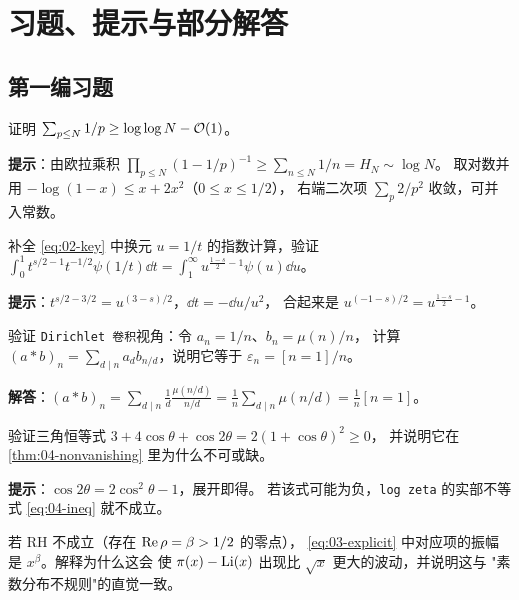 \chapter{习题、提示与部分解答}
\label{app:exercises}

\section{第一编习题}
\begin{exercise}
证明 $\sum_{p\le N}1/p\ge\log\log N-\mathcal{O}(1)$。
\par\textbf{提示}：由欧拉乘积
$\prod_{p\le N}(1-1/p)^{-1}\ge\sum_{n\le N}1/n=H_N\sim\log N$。
取对数并用 $-\log(1-x)\le x+2x^2$（$0\le x\le1/2$），
右端二次项 $\sum_p 2/p^2$ 收敛，可并入常数。
\end{exercise}

\begin{exercise}
补全 \cref{eq:02-key} 中换元 $u=1/t$ 的指数计算，验证
$\int_0^1 t^{s/2-1}t^{-1/2}\psi(1/t)\dd t
=\int_1^\infty u^{\frac{1-s}{2}-1}\psi(u)\dd u$。
\par\textbf{提示}：$t^{s/2-3/2}=u^{(3-s)/2}$，$\dd t=-\dd u/u^2$，
合起来是 $u^{(-1-s)/2}=u^{\frac{1-s}{2}-1}$。
\end{exercise}

\begin{exercise}
验证 \texttt{Dirichlet 卷积}视角：令 $a_n=1/n$、$b_n=\mu(n)/n$，
计算 $(a*b)_n=\sum_{d\mid n}a_d b_{n/d}$，说明它等于 $\varepsilon_n=[n=1]/n$。
\par\textbf{解答}：$(a*b)_n=\sum_{d\mid n}\frac1d\frac{\mu(n/d)}{n/d}
=\frac1n\sum_{d\mid n}\mu(n/d)=\frac1n[n=1]$。
\end{exercise}

\begin{exercise}
验证三角恒等式 $3+4\cos\theta+\cos2\theta=2(1+\cos\theta)^2\ge0$，
并说明它在 \cref{thm:04-nonvanishing} 里为什么不可或缺。
\par\textbf{提示}：$\cos2\theta=2\cos^2\theta-1$，展开即得。
若该式可能为负，\texttt{log zeta} 的实部不等式 \cref{eq:04-ineq} 就不成立。
\end{exercise}

\begin{exercise}[思考题]
若 RH 不成立（存在 $\operatorname{Re}\rho=\beta>1/2$ 的零点），
\cref{eq:03-explicit} 中对应项的振幅是 $x^\beta$。解释为什么这会
使 $\pi(x)-\operatorname{Li}(x)$ 出现比 $\sqrt{x}$ 更大的波动，并说明这与
"素数分布不规则"的直觉一致。
\end{exercise}

